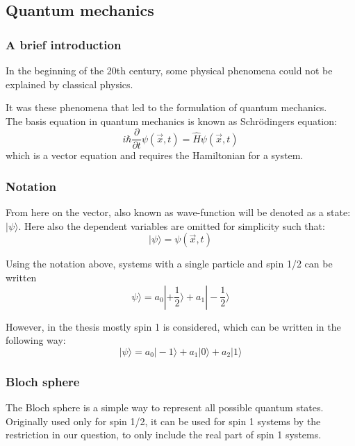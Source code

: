 \documentclass[•]{beamer}
\theoremstyle{remark}
\begin{document}
\subsection{Quantum mechanics}
\begin{frame}[shrink=10]\frametitle{A brief introduction}
\begin{block}

In the beginning of the 20th century, some physical phenomena could not be
explained by classical physics.
\pause


It was these phenomena that led to the formulation of
quantum mechanics. \\
\pause
The basis equation in quantum mechanics is known as Schr\"odingers equation:
\begin{equation*} 
i\hbar\frac{\partial}{\partial t}\psi (\vec{x}, t) = \hat{H}\psi (\vec{x}, t)
\end{equation*}
which is a vector equation and requires the Hamiltonian for a system.
\end{block}
\end{frame}
\begin{frame}[shrink=10]\frametitle{Notation}
\begin{block}

From here on the vector, also known as wave-function will be denoted as a state: $|\psi\rangle$.
Here also the dependent variables are omitted for simplicity such that: 
$$|\psi\rangle = \psi (\vec{x}, t)$$ 
\end{block}
\pause
\begin{example}
Using the notation above, systems with a single particle and spin 1/2 can be written
$$ \psi\rangle =a_0|+\frac{1}{2}\rangle+a_1|-\frac{1}{2}\rangle$$
\end{example}
\end{frame}
\begin{frame}
\begin{example}
However, in the thesis mostly spin 1 is considered, which can be written in the following way:
$$|\psi\rangle=a_0|-1\rangle+a_1|0\rangle+a_2|1\rangle$$
\end{example}
\end{frame}
\begin{frame}\frametitle{Bloch sphere}
\begin{block}

The Bloch sphere is a simple way to represent all possible quantum states. Originally used only for spin 1/2, it can be used for spin 1 systems by  the restriction in our question, to only include the real part of spin 1 systems. 
\end{block}
\end{frame}
\end{document}

